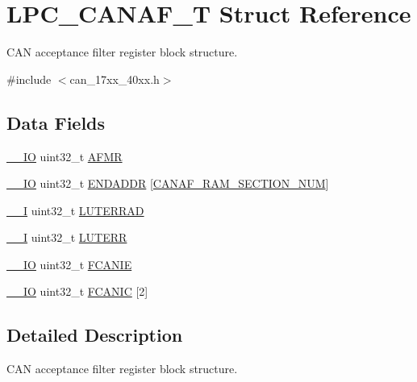 \hypertarget{structLPC__CANAF__T}{\section{L\-P\-C\-\_\-\-C\-A\-N\-A\-F\-\_\-\-T Struct Reference}
\label{structLPC__CANAF__T}
}


C\-A\-N acceptance filter register block structure.  




{\ttfamily \#include $<$can\-\_\-17xx\-\_\-40xx.\-h$>$}

\subsection*{Data Fields}
\begin{DoxyCompactItemize}
\item 
\hyperlink{core__cm3_8h_aec43007d9998a0a0e01faede4133d6be}{\-\_\-\-\_\-\-I\-O} uint32\-\_\-t \hyperlink{structLPC__CANAF__T_a987f2996cd4432665a2cbde52251f429}{A\-F\-M\-R}
\item 
\hyperlink{core__cm3_8h_aec43007d9998a0a0e01faede4133d6be}{\-\_\-\-\_\-\-I\-O} uint32\-\_\-t \hyperlink{structLPC__CANAF__T_ab62d75d561c2446b4ac8ce383e566498}{E\-N\-D\-A\-D\-D\-R} \mbox{[}\hyperlink{group__CAN__17XX__40XX_ggaf0ae33e71a7acfc561972811aa1207e8a367c14b1175c83cd2ed218b1cb23b010}{C\-A\-N\-A\-F\-\_\-\-R\-A\-M\-\_\-\-S\-E\-C\-T\-I\-O\-N\-\_\-\-N\-U\-M}\mbox{]}
\item 
\hyperlink{core__cm3_8h_af63697ed9952cc71e1225efe205f6cd3}{\-\_\-\-\_\-\-I} uint32\-\_\-t \hyperlink{structLPC__CANAF__T_ac98a6bb03e4031fbfee27c49b884fddd}{L\-U\-T\-E\-R\-R\-A\-D}
\item 
\hyperlink{core__cm3_8h_af63697ed9952cc71e1225efe205f6cd3}{\-\_\-\-\_\-\-I} uint32\-\_\-t \hyperlink{structLPC__CANAF__T_acd4acbf7638e632b78feaccdba530c88}{L\-U\-T\-E\-R\-R}
\item 
\hyperlink{core__cm3_8h_aec43007d9998a0a0e01faede4133d6be}{\-\_\-\-\_\-\-I\-O} uint32\-\_\-t \hyperlink{structLPC__CANAF__T_aca9607036e23ed6523777c80e1ab1147}{F\-C\-A\-N\-I\-E}
\item 
\hyperlink{core__cm3_8h_aec43007d9998a0a0e01faede4133d6be}{\-\_\-\-\_\-\-I\-O} uint32\-\_\-t \hyperlink{structLPC__CANAF__T_a89079a08d1150a7761dff98d0130d7e5}{F\-C\-A\-N\-I\-C} \mbox{[}2\mbox{]}
\end{DoxyCompactItemize}


\subsection{Detailed Description}
C\-A\-N acceptance filter register block structure. 

